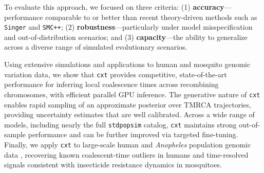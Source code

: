 \documentclass{article}
\newcommand{\cxtkit}{\texttt{cxt}\xspace}
\let\citep\parencite
\newcommand{\stdpopsim}{\texttt{stdpopsim}\xspace}
\newcommand{\singer}{\texttt{Singer}\xspace}
\newcommand{\smcpp}{\texttt{SMC++}\xspace}
\begin{document}
To evaluate this approach, we focused on three criteria:
(1) \textbf{accuracy}---performance comparable to or better than recent theory-driven methods such as \singer and \smcpp;
(2) \textbf{robustness}---particularly under model misspecification and out-of-distribution scenarios; and
(3) \textbf{capacity}---the ability to generalize across a diverse range of simulated evolutionary scenarios.


Using extensive simulations and applications to human and mosquito genomic variation data,
we show that \cxtkit provides competitive, state-of-the-art performance for
inferring local coalescence times across recombining chromosomes,
with efficient parallel GPU inference.
The generative nature of \cxtkit enables rapid sampling of an approximate posterior over TMRCA trajectories,
providing uncertainty estimates that are well calibrated.
Across a wide range of models, including nearly the full \stdpopsim catalog,
\cxtkit maintains strong out-of-sample performance and can be further improved via targeted fine-tuning.
Finally, we apply \cxtkit to large-scale human and \textit{Anopheles} population genomic data
\citep{10002010map, auton20151000, anopheles2017genetic, clarkson2020genome},
recovering known coalescent-time outliers in humans and time-resolved signals consistent with insecticide resistance dynamics in mosquitoes.
\end{document}
